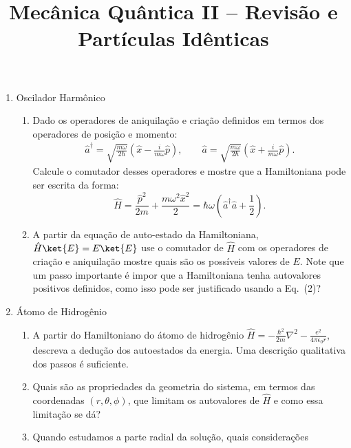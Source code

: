 \newif\ifuseseminar
\useseminartrue


\title{Mecânica Quântica II -- Revisão e Partículas Idênticas}


\begin{enumerate}
	\item Oscilador Harmônico
	      \begin{enumerate}
		      \item Dado os operadores de aniquilação e criação definidos em termos dos
		            operadores de posição e momento:
		            \begin{align}
			            \hat{a}^\dagger = \sqrt{\frac{m\omega}{2\hbar}}\left(\hat{x} -
			            \frac{i}{m\omega}\hat{p}\right), \qquad \hat{a} =
			            \sqrt{\frac{m\omega}{2\hbar}}\left(\hat{x} + \frac{i}{m\omega}\hat{p}\right).
		            \end{align}
		            Calcule o comutador desses operadores e mostre que a Hamiltoniana
		            pode ser escrita da forma:
		            \begin{equation}
			            \hat{H} = \frac{\hat{p}^2}{2m} + \frac{m\omega^2\hat{x}^2}{2}=
			            \hbar\omega \left( \hat{a}^\dagger \hat{a} + \frac{1}{2} \right).
		            \end{equation}
		      \item A partir da equação de auto-estado da Hamiltoniana, $\hat{H}\ket{E}
			            = E\ket{E}$ use o comutador de $\hat{H}$ com os operadores de criação e
		            aniquilação mostre quais são os possíveis valores de $E$. Note que um
		            passo importante é impor que a Hamiltoniana tenha autovalores positivos
		            definidos, como isso pode ser justificado usando a Eq.~(2)?
	      \end{enumerate}
	\item Átomo de Hidrogênio
	      \begin{enumerate}
		      \item A partir do Hamiltoniano do átomo de hidrogênio $\hat{H} =
			            -\frac{\hbar^2}{2m} \nabla^2 - \frac{e^2}{4\pi\epsilon_0 r}$, descreva a
		            dedução dos autoestados da energia. Uma descrição qualitativa dos passos é
		            suficiente.
		      \item Quais são as propriedades da geometria do sistema, em termos das
		            coordenadas $(r,\theta,\phi)$, que limitam os autovalores de $\hat{H}$ e
		            como essa limitação se dá?
		      \item Quando estudamos a parte radial da solução, quais considerações

\end{enumerate}
\end{enumerate}

